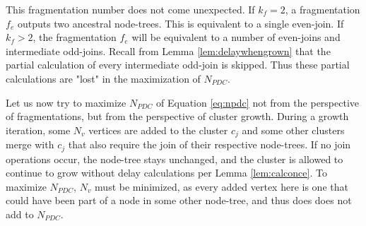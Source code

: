 This fragmentation number does not come unexpected. If $k_f=2$, a fragmentation $f_e$ outputs two ancestral node-trees. This is equivalent to a single even-join. If $k_f>2$, the fragmentation $f_e$ will be equivalent to a number of even-joins and intermediate odd-joins. Recall from Lemma \ref{lem:delaywhengrown} that the partial calculation of every intermediate odd-join is skipped. Thus these partial calculations are "lost" in the maximization of $N_{PDC}$. 

Let us now try to maximize $N_{PDC}$ of Equation \eqref{eq:npdc} not from the perspective of fragmentations, but from the perspective of cluster growth. During a growth iteration, some $N_v$ vertices are added to the cluster $c_j$ and some other clusters merge with $c_j$ that also require the join of their respective node-trees. If no join operations occur, the node-tree stays unchanged, and the cluster is allowed to continue to grow without delay calculations per Lemma \ref{lem:calconce}. To maximize $N_{PDC}$, $N_v$ must be minimized, as every added vertex here is one that could have been part of a node in some other node-tree, and thus does does not add to $N_{PDC}$. 

